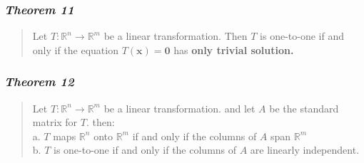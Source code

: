 \documentclass[11pt]{article}
\makeatletter
\newcommand{\boxspacing}{\kern\kvtcb@left@rule\kern\kvtcb@boxsep}
\newcommand{\prompt}[4]{
        \ttfamily\llap{{\color{#2}[#3]:\hspace{3pt}#4}}\vspace{-\baselineskip}
    }
\makeatother
\begin{document}
    \hypertarget{theorem-11}{%
\subsubsection{\texorpdfstring{\emph{Theorem
11}}{Theorem 11}}\label{theorem-11}}

\begin{quote}
Let \(T : \mathbb{R}^n {\rightarrow} \mathbb{R}^m\) be a linear
transformation. Then \(T\) is one-to-one if and only if the equation
\(T(\mathbf{x}) = \mathbf{0}\) has \textbf{only trivial solution.}
\end{quote}

    \hypertarget{theorem-12}{%
\subsubsection{\texorpdfstring{\emph{Theorem
12}}{Theorem 12}}\label{theorem-12}}

\begin{quote}
Let \(T : \mathbb{R}^n {\rightarrow} \mathbb{R}^m\) be a linear
transformation. and let \(A\) be the standard matrix for \(T\). then:\\
a. \(T\) maps \(\mathbb{R}^n\) onto \(\mathbb{R}^m\) if and only if the
columns of \(A\) span \(\mathbb{R}^m\)\\
b. \(T\) is one-to-one if and only if the columns of \(A\) are linearly
independent.
\end{quote}

    \begin{tcolorbox}[breakable, size=fbox, boxrule=1pt, pad at break*=1mm,colback=cellbackground, colframe=cellborder]
\prompt{In}{incolor}{ }{\boxspacing}
\begin{Verbatim}[commandchars=\\\{\}]

\end{Verbatim}
\end{tcolorbox}


    
    
    
\end{document}

